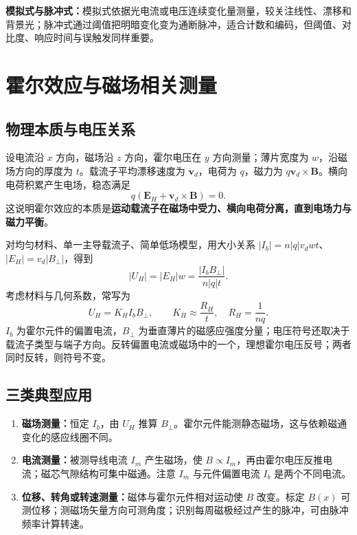 \textbf{模拟式与脉冲式：}模拟式依据光电流或电压连续变化量测量，较关注线性、漂移和背景光；脉冲式通过阈值把明暗变化变为通断脉冲，适合计数和编码，但阈值、对比度、响应时间与误触发同样重要。



\Needspace{5cm}
\section{霍尔效应与磁场相关测量}
\label{sec:ch4-hall}

\subsection{物理本质与电压关系}
设电流沿 $x$ 方向，磁场沿 $z$ 方向，霍尔电压在 $y$ 方向测量；薄片宽度为 $w$，沿磁场方向的厚度为 $t$。载流子平均漂移速度为 $\mathbf v_d$，电荷为 $q$，磁力为 $q\mathbf v_d\times\mathbf B$。横向电荷积累产生电场，稳态满足
\[
q(\mathbf E_H+\mathbf v_d\times\mathbf B)=0.
\]
这说明霍尔效应的本质是\textbf{运动载流子在磁场中受力、横向电荷分离，直到电场力与磁力平衡}。

对均匀材料、单一主导载流子、简单低场模型，用大小关系 $|I_b|=n|q|v_dwt$、$|E_H|=v_d|B_\perp|$，得到
\[
|U_H|=|E_H|w=\frac{|I_bB_\perp|}{n|q|t}.
\]
考虑材料与几何系数，常写为
\[
\boxed{U_H=K_HI_bB_\perp},\qquad
K_H\approx\frac{R_H}{t},\quad R_H=\frac{1}{nq}.
\]
$I_b$ 为霍尔元件的偏置电流，$B_\perp$ 为垂直薄片的磁感应强度分量；电压符号还取决于载流子类型与端子方向。反转偏置电流或磁场中的一个，理想霍尔电压反号；两者同时反转，则符号不变。

\subsection{三类典型应用}
\begin{enumerate}
\item \textbf{磁场测量：}恒定 $I_b$，由 $U_H$ 推算 $B_\perp$。霍尔元件能测静态磁场，这与依赖磁通变化的感应线圈不同。
\item \textbf{电流测量：}被测导线电流 $I_m$ 产生磁场，使 $B\propto I_m$，再由霍尔电压反推电流；磁芯气隙结构可集中磁通。注意 $I_m$ 与元件偏置电流 $I_b$ 是两个不同电流。
\item \textbf{位移、转角或转速测量：}磁体与霍尔元件相对运动使 $B$ 改变。标定 $B(x)$ 可测位移；测磁场矢量方向可测角度；识别每周磁极经过产生的脉冲，可由脉冲频率计算转速。
\end{enumerate}

